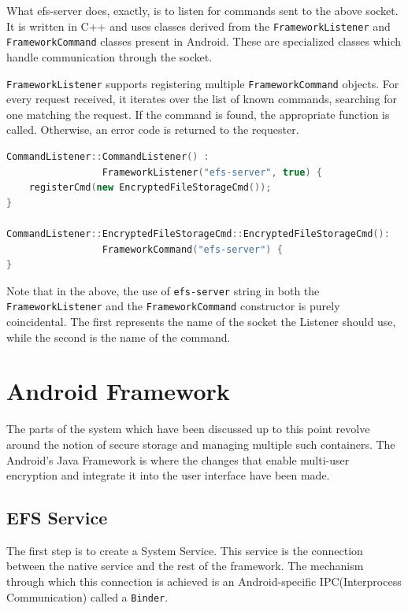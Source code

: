 What efs-server does, exactly, is to listen for commands sent to the above socket. It is written in C++ and uses classes derived from the \texttt{FrameworkListener} and \texttt{FrameworkCommand} classes present in Android. These are specialized classes which handle communication through the socket.

\texttt{FrameworkListener} supports registering multiple \texttt{FrameworkCommand} objects. For every request received, it iterates over the list of known commands, searching for one matching the request. If the command is found, the appropriate function is called. Otherwise, an error code is returned to the requester.

\begin{lstlisting}[language=C++, caption=Command Listener Initialization, label=lst:cmd-init]
CommandListener::CommandListener() :
                 FrameworkListener("efs-server", true) {
    registerCmd(new EncryptedFileStorageCmd());
}

CommandListener::EncryptedFileStorageCmd::EncryptedFileStorageCmd():
                 FrameworkCommand("efs-server") {
}
\end{lstlisting}

Note that in the above, the use of \texttt{efs-server} string in both the \texttt{FrameworkListener} and the \texttt{FrameworkCommand} constructor is purely coincidental. The first represents the name of the socket the Listener should use, while the second is the name of the command.

\section{Android Framework}
\label{sec:android-frmwrk-multi-user}

The parts of the system which have been discussed up to this point revolve around the notion of secure storage and managing multiple such containers. The Android's Java Framework is where the changes that enable multi-user encryption and integrate it into the user interface have been made.

\subsection{EFS Service}
\label{sub-sec:system-service-multi-user}

The first step is to create a System Service. This service is the connection between the native service and the rest of the framework. The mechanism through which this connection is achieved is an Android-specific IPC(Interprocess Communication) called a \texttt{Binder}.

